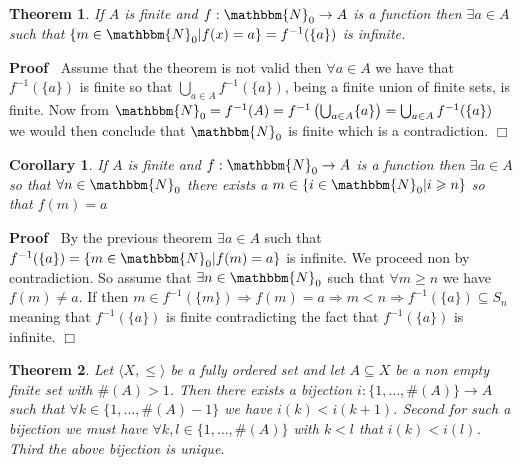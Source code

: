 \documentclass{book}
\newenvironment{proof}{\noindent\textbf{Proof\ }}{\hspace*{\fill}$\Box$\medskip}
\newtheorem{corollary}{Corollary}
\newtheorem{theorem}{Theorem}
\begin{document}
{{\begin{theorem}
  If $A$ is finite and $f : \mathbbm{N}_0 \rightarrow A$ is a function then
  $\exists a \in A$ such that $\{ m \in \mathbbm{N}_0 |f (x) = a \} = f^{- 1}
  (\{ a \})$ is infinite.
\end{theorem}

\begin{proof}
  Assume that the theorem is not valid then $\forall a \in A$ we have that
  $f^{- 1} (\{ a \})$ is finite so that $\bigcup_{a \in A} f^{- 1} (\{ a \})$,
  being a finite union of finite sets, is finite. Now from $\mathbbm{N}_0 =
  f^{- 1} (A) = f^{- 1} \left( \bigcup_{a \in A} \{ a \} \right) = \bigcup_{a
  \in A} f^{- 1} (\{ a \})$ we would then conclude that $\mathbbm{N}_0$ is
  finite which is a contradiction.
\end{proof}

\begin{corollary}
  \label{mapping of N into a finite set}If $A$ is finite and $f :
  \mathbbm{N}_0 \rightarrow A$ is a function then $\exists a \in A$ so that
  $\forall n \in \mathbbm{N}_0$ there exists a $m \in \{ i \in \mathbbm{N}_0
  |i \geqslant n \}$ so that $f (m) = a$
\end{corollary}

\begin{proof}
  By the previous theorem $\exists a \in A$ such that $f^{- 1} (\{ a \}) = \{
  m \in \mathbbm{N}_0 |f (m) = a \}$ is infinite. We proceed non by
  contradiction. So assume that $\exists n \in \mathbbm{N}_0$ such that
  $\forall m \geqslant n$ we have $f (m) \neq a$. If then $m \in f^{- 1} (\{ m
  \}) \Rightarrow f (m) = a \Rightarrow m < n \Rightarrow f^{- 1} (\{ a \})
  \subseteq S_n$ meaning that $f^{- 1} (\{ a \})$ is finite contradicting the
  fact that $f^{- 1} (\{ a \})$ is infinite. 
\end{proof}

\begin{theorem}
  \label{ordering of a finite set}Let $\langle X, \leqslant \rangle$ be a
  fully ordered set and let $A \subseteq X$ be a non empty finite set with $\#
  (A) > 1$. Then there exists a bijection $i : \{ 1, \ldots, \# (A) \}
  \rightarrow A$ such that $\forall k \in \{ 1, \ldots, \# (A) - 1 \}$ we have
  $i (k) < i (k + 1)$. Second for such a bijection we must have $\forall k, l
  \in \{ 1, \ldots, \# (A) \}$ with $k < l$ that $i (k) < i (l)$. Third the
  above bijection is unique.
\end{theorem}

}}
\end{document}
